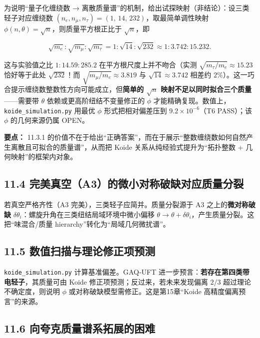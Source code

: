为说明``量子化缠绕数 →
离散质量谱''的机制，给出试探映射（非结论）：设三类轻子对应缠绕数
\((n_e,n_\mu,n_\tau)=(1,\,14,\,232)\)，取最简单调性映射
\(\phi(n,\theta)=\sqrt{n}\)，则质量平方根正比于 \(\sqrt{n}\)，即

\[
\sqrt{m_e}:\sqrt{m_\mu}:\sqrt{m_\tau}=1:\sqrt{14}:\sqrt{232}\approx1:3.742:15.232.
\]

这与实验值之比 \(1:14.59:285.2\) 在平方根尺度上并不吻合（实测
\(\sqrt{m_\tau/m_e}\approx15.23\) 恰好等于此处 \(\sqrt{232}\)！而
\(\sqrt{m_\mu/m_e}\approx3.819\) 与 \(\sqrt{14}\approx3.742\) 相差约
\(2\%\)）。这一巧合提示缠绕数整数性方向可能成立，但\textbf{简单的
\(\sqrt{n}\) 映射不足以同时拟合三个质量}------需要带 \(\theta\)
依赖或更高阶纽结不变量修正的 \(\phi\)
才能精确复现。数值上，\texttt{koide\_simulation.py} 用最优 \(\phi\)
形式把相对偏差压到 \(9.2\times10^{-6}\)（T6 PASS）；该 \(\phi\)
的几何来源仍属 OPEN。

\textbf{要点：} 11.3.1
的价值不在于给出``正确答案''，而在于展示``整数缠绕数如何自然产生离散且可拟合的质量谱''，从而把
Koide 关系从纯经验式提升为``拓扑整数 + 几何映射''的框架内对象。

\subsection{11.4
完美真空（A3）的微小对称破缺对应质量分裂}\label{ux5b8cux7f8eux771fux7a7aa3ux7684ux5faeux5c0fux5bf9ux79f0ux7834ux7f3aux5bf9ux5e94ux8d28ux91cfux5206ux88c2}

若真空严格齐性（A3 完美），三类轻子应简并。质量分裂源于 A3
之上的\textbf{微对称破缺}
\(\delta\theta_i\)：螺旋升角在三类纽结局域环境中微小偏移
\(\theta\to\theta+\delta\theta_i\)，产生质量分裂。这把``味混合/质量
hierarchy''转化为``局域几何微扰谱''。

\subsection{11.5
数值扫描与理论修正项预测}\label{ux6570ux503cux626bux63cfux4e0eux7406ux8bbaux4feeux6b63ux9879ux9884ux6d4b}

\texttt{koide\_simulation.py} 计算基准偏差。GAQ‑UFT
进一步预言：\textbf{若存在第四类带电轻子}，其质量可由 Koide
修正项预测；反过来，若未来发现偏离 \(2/3\) 超过理论不确定度，则说明
\(\phi\) 或对称破缺模型需修正。这是第15章``Koide
高精度偏离预言''的来源。

\subsection{11.6
向夸克质量谱系拓展的困难}\label{ux5411ux5938ux514bux8d28ux91cfux8c31ux7cfbux62d3ux5c55ux7684ux56f0ux96be}

